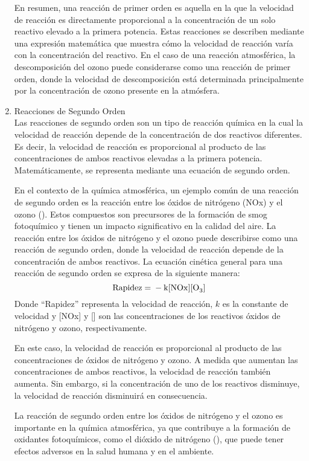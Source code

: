 \begin{enumerate}
En resumen, una reacción de primer orden es aquella en la que la velocidad de reacción es directamente proporcional a la concentración de un solo reactivo elevado a la primera potencia. Estas reacciones se describen mediante una expresión matemática que muestra cómo la velocidad de reacción varía con la concentración del reactivo. En el caso de una reacción atmosférica, la descomposición del ozono puede considerarse como una reacción de primer orden, donde la velocidad de descomposición está determinada principalmente por la concentración de ozono presente en la atmósfera.

\item Reacciones de Segundo Orden  \\
Las reacciones de segundo orden son un tipo de reacción química en la cual la velocidad de reacción depende de la concentración de dos reactivos diferentes. Es decir, la velocidad de reacción es proporcional al producto de las concentraciones de ambos reactivos elevadas a la primera potencia. Matemáticamente, se representa mediante una ecuación de segundo orden.

En el contexto de la química atmosférica, un ejemplo común de una reacción de segundo orden es la reacción entre los óxidos de nitrógeno (NOx) y el ozono (). Estos compuestos son precursores de la formación de smog fotoquímico y tienen un impacto significativo en la calidad del aire.
La reacción entre los óxidos de nitrógeno y el ozono puede describirse como una reacción de segundo orden, donde la velocidad de reacción depende de la concentración de ambos reactivos. La ecuación cinética general para una reacción de segundo orden se expresa de la siguiente manera:
 \begin{equation*}
\ce{Rapidez = - k[NOx][O3]}
 \end{equation*}
Donde ``Rapidez'' representa la velocidad de reacción, $k$ es la constante de velocidad y [NOx] y [] son las concentraciones de los reactivos óxidos de nitrógeno y ozono, respectivamente.

En este caso, la velocidad de reacción es proporcional al producto de las concentraciones de óxidos de nitrógeno y ozono. A medida que aumentan las concentraciones de ambos reactivos, la velocidad de reacción también aumenta. Sin embargo, si la concentración de uno de los reactivos disminuye, la velocidad de reacción disminuirá en consecuencia.

La reacción de segundo orden entre los óxidos de nitrógeno y el ozono es importante en la química atmosférica, ya que contribuye a la formación de oxidantes fotoquímicos, como el dióxido de nitrógeno (), que puede tener efectos adversos en la salud humana y en el  ambiente.


\end{enumerate}
